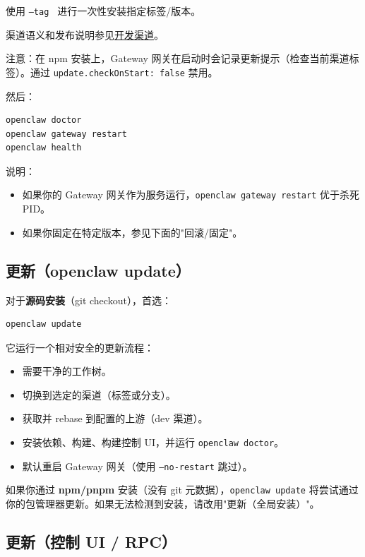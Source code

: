 使用 \texttt{--tag } 进行一次性安装指定标签/版本。

渠道语义和发布说明参见\href{/install/development-channels}{开发渠道}。

注意：在 npm 安装上，Gateway 网关在启动时会记录更新提示（检查当前渠道标签）。通过 \texttt{update.checkOnStart: false} 禁用。

然后：

\begin{lstlisting}[language=bash]
openclaw doctor
openclaw gateway restart
openclaw health
\end{lstlisting}


说明：

\begin{itemize}
  \item 如果你的 Gateway 网关作为服务运行，\texttt{openclaw gateway restart} 优于杀死 PID。
  \item 如果你固定在特定版本，参见下面的"回滚/固定"。
\end{itemize}


\subsection{更新（openclaw update）}


对于\textbf{源码安装}（git checkout），首选：

\begin{lstlisting}[language=bash]
openclaw update
\end{lstlisting}


它运行一个相对安全的更新流程：

\begin{itemize}
  \item 需要干净的工作树。
  \item 切换到选定的渠道（标签或分支）。
  \item 获取并 rebase 到配置的上游（dev 渠道）。
  \item 安装依赖、构建、构建控制 UI，并运行 \texttt{openclaw doctor}。
  \item 默认重启 Gateway 网关（使用 \texttt{--no-restart} 跳过）。
\end{itemize}


如果你通过 \textbf{npm/pnpm} 安装（没有 git 元数据），\texttt{openclaw update} 将尝试通过你的包管理器更新。如果无法检测到安装，请改用"更新（全局安装）"。

\subsection{更新（控制 UI / RPC）}


